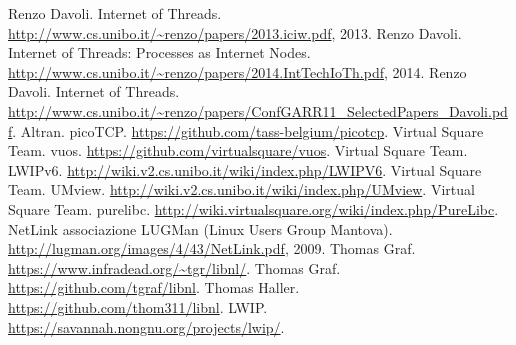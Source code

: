 
\begin{thebibliography}{90}             %
\rhead[\fancyplain{}{\bfseries \leftmark}]{\fancyplain{}{\bfseries
\thepage}}
 Renzo Davoli. Internet of Threads. \url{http://www.cs.unibo.it/~renzo/papers/2013.iciw.pdf}, 2013.
 Renzo Davoli. Internet of Threads: Processes as Internet Nodes. \url{http://www.cs.unibo.it/~renzo/papers/2014.IntTechIoTh.pdf}, 2014.
 Renzo Davoli. Internet of Threads. \url{http://www.cs.unibo.it/~renzo/papers/ConfGARR11_SelectedPapers_Davoli.pdf}.
 Altran. picoTCP. \url{https://github.com/tass-belgium/picotcp}.
 Virtual Square Team. vuos. \url{https://github.com/virtualsquare/vuos}.
 Virtual Square Team. LWIPv6. \url{http://wiki.v2.cs.unibo.it/wiki/index.php/LWIPV6}.
 Virtual Square Team. UMview. \url{http://wiki.v2.cs.unibo.it/wiki/index.php/UMview}.
 Virtual Square Team. purelibc. \url{http://wiki.virtualsquare.org/wiki/index.php/PureLibc}.
 NetLink associazione LUGMan (Linux Users Group Mantova). \url{http://lugman.org/images/4/43/NetLink.pdf}, 2009.
 Thomas Graf. \url{https://www.infradead.org/~tgr/libnl/}.
 Thomas Graf. \url{https://github.com/tgraf/libnl}.
 Thomas Haller. \url{https://github.com/thom311/libnl}.
 LWIP. \url{https://savannah.nongnu.org/projects/lwip/}.
\end{thebibliography}
\clearpage{\pagestyle{empty}\cleardoublepage} 
